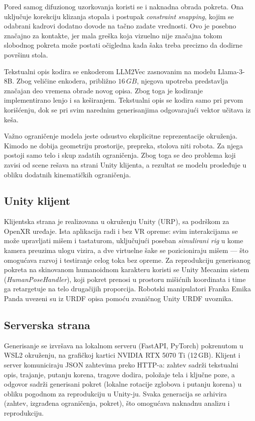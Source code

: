 \documentclass{article}
\begin{document}
Pored samog difuzionog uzorkovanja koristi se i naknadna obrada pokreta. Ona uključuje korekciju klizanja stopala i postupak \textit{constraint snapping}, kojim se odabrani kadrovi dodatno dovode na tačno zadate vrednosti. Ovo je posebno značajno za kontakte, jer mala greška koja vizuelno nije značajna tokom slobodnog pokreta može postati očigledna kada šaka treba precizno da dodirne površinu stola.

Tekstualni opis kodira se enkoderom LLM2Vec \cite{llm2vec2024} zasnovanim na modelu Llama-3-8B. Zbog veličine enkodera, približno $16\,GB$, njegova upotreba predstavlja značajan deo vremena obrade novog opisa. Zbog toga je kodiranje implementirano lenjo i sa keširanjem. Tekstualni opis se kodira samo pri prvom korišćenju, dok se pri svim narednim generisanjima odgovarajući vektor učitava iz keša.

Važno ograničenje modela jeste odsustvo eksplicitne reprezentacije okruženja. Kimodo ne dobija geometriju prostorije, prepreka, stolova niti robota. Za njega postoji samo telo i skup zadatih ograničenja. Zbog toga se deo problema koji zavisi od scene rešava na strani Unity klijenta, a rezultat se modelu prosleđuje u obliku dodatnih kinematičkih ograničenja.

\subsection{Unity klijent}

Klijentska strana je realizovana u okruženju Unity (URP), sa podrškom za OpenXR uređaje. Ista aplikacija radi i bez VR opreme: svim interakcijama se može upravljati mišem i tastaturom, uključujući poseban \emph{simulirani rig} u kome kamera preuzima ulogu vizira, a dve virtuelne šake se pozicioniraju mišem --- što omogućava razvoj i testiranje celog toka bez opreme. Za reprodukciju generisanog pokreta na skinovanom humanoidnom karakteru koristi se Unity Mecanim sistem (\textit{HumanPoseHandler}), koji pokret prenosi u prostoru mišićnih koordinata i time ga retargetuje na telo drugačijih proporcija. Robotski manipulatori Franka Emika Panda uvezeni su iz URDF opisa pomoću zvaničnog Unity URDF uvoznika.

\subsection{Serverska strana}

Generisanje se izvršava na lokalnom serveru (FastAPI, PyTorch) pokrenutom u WSL2 okruženju, na grafičkoj kartici NVIDIA RTX 5070 Ti (12\,GB). Klijent i server komuniciraju JSON zahtevima preko HTTP-a: zahtev sadrži tekstualni opis, trajanje, putanju korena, tragove dodira, položaje tela i ključne poze, a odgovor sadrži generisani pokret (lokalne rotacije zglobova i putanju korena) u obliku pogodnom za reprodukciju u Unity-ju. Svaka generacija se arhivira (zahtev, izgrađena ograničenja, pokret), što omogućava naknadnu analizu i reprodukciju.
\end{document}
